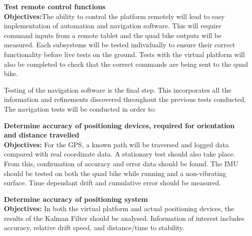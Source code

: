 \documentclass[main.tex]{subfiles}
\begin{document}
\begin{appendices}
\begin{qb}
\end{qb}
\begin{qb}
\textbf{Test remote control functions}\\
\textbf{Objectives:}The ability to control the platform remotely will lead to easy implementation of automation and navigation software. This will require command inputs from a remote tablet and the quad bike outputs will be measured. Each subsystems will be tested individually to ensure their correct functionality before live tests on the ground. Tests with the virtual platform will also be completed to check that the correct commands are being sent to the quad bike.  
\end{qb}

\medskip\noindent 
Testing of the navigation software is the final step. This incorporates all the information and refinements discovered throughout the previous tests conducted. The navigation tests will be conducted in order to:

\begin{qb}
\textbf{Determine accuracy of positioning devices, required for orientation and distance travelled}\\
\textbf{Objectives:} For the GPS, a known path will be traversed and logged data compared with real coordinate data. A stationary test should also take place. From this, confirmation of accuracy and error data should be found. The IMU should be tested on both the quad bike while running and a non-vibrating surface. Time dependant drift and cumulative error should be measured.
\end{qb}

\begin{qb}
\textbf{Determine accuracy of positioning system}\\
\textbf{Objectives:} In both the virtual platform and actual positioning devices, the results of the Kalman Filter should be analysed. Information of interest includes accuracy, relative drift speed, and distance/time to stability.
\end{qb}



\end{appendices}
\end{document}
